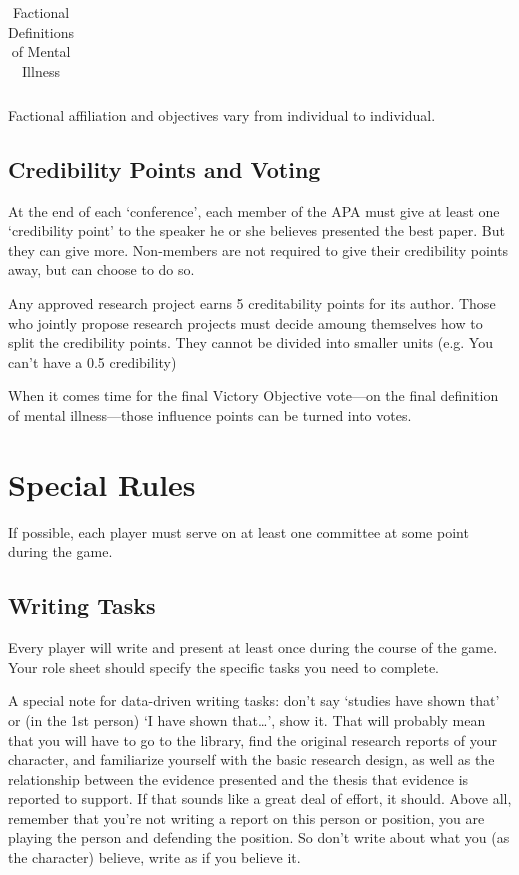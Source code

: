 \begin{refsection}
\begin{longtable}[!t]{ | p{2cm} | p{12cm} | }
\caption{Factional Definitions of Mental Illness}
\label{table: definitions}
\end{longtable}

Factional affiliation and objectives vary from individual to individual.

\subsection{Credibility Points and Voting}
\label{credibilitypointsandvoting}

At the end of each `conference', each member of the APA must give at least one `credibility point' to the speaker he or she believes presented the best paper. But they can give more. Non-members are not required to give their credibility points away, but can choose to do so. 

Any approved research project earns 5 creditability points for its author. Those who jointly propose research projects must decide amoung themselves how to split the credibility points. They cannot be divided into smaller units (e.g. You can't have a 0.5 credibility)

When it comes time for the final Victory Objective vote---on the final definition of mental illness---those influence points can be turned into votes.

\section{Special Rules}
\label{specialrules}

If possible, each player must serve on at least one committee at some point during the game.

\subsection{Writing Tasks}
\label{writingtasks}

Every player will write and present at least once during the course of the game. Your role sheet should specify the specific tasks you need to complete.

A special note for data-driven writing tasks: don't say `studies have shown that' or (in the 1st person) `I have shown that{\ldots}', show it. That will probably mean that you will have to go to the library, find the original research reports of your character, and familiarize yourself with the basic research design, as well as the relationship between the evidence presented and the thesis that evidence is reported to support. If that sounds like a great deal of effort, it should. Above all, remember that you're not writing a report on this person or position, you are playing the person and defending the position. So don't write about what you (as the character) believe, write as if you believe it.


\end{refsection}
